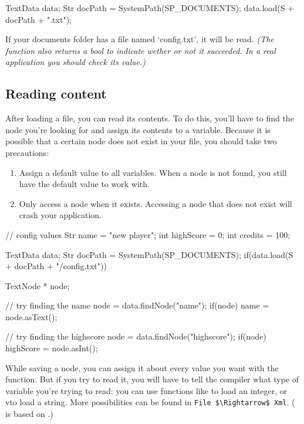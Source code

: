 \begin{code}
TextData data;
Str docPath = SystemPath(SP_DOCUMENTS);
data.load(S + docPath + "\config.txt");
\end{code}

If your documents folder has a file named `config.txt', it will be read. \textsl{(The function also returns a bool to indicate wether or not it succeeded. In a real application you should check its value.)}

\subsection{Reading content}
After loading a file, you can read its contents. To do this, you'll have to find the node you're looking for and assign its contents to a variable. Because it is possible that a certain node does not exist in your file, you should take two precautions:

\begin{enumerate}
	\item Assign a default value to all variables. When a node is not found, you still have the default value to work with.
	\item Only access a node when it exists. Accessing a node that does not exist will crash your application.
\end{enumerate}

\begin{code}
// config values
Str name = "new player";
int highScore = 0;
int credits = 100;

TextData data;
Str docPath = SystemPath(SP_DOCUMENTS);
if(data.load(S + docPath + "/config.txt")) {
   TextNode * node;
	 
	 // try finding the name
	 node = data.findNode("name");
	 if(node) {
	    name = node.asText();
	 }
	 
	 // try finding the highscore
	 node = data.findNode("highscore");
	 if(node) {
	    highScore = node.asInt();
	 }
}
\end{code}

\begin{note}
While saving a node, you can assign it about every value you want with the function. But if you try to read it, you will have to tell the compiler what type of variable you're trying to read: you can use functions like  to load an integer, or  vto load a string. More possibilities can be found in \verb|File $\Rightarrow$ Xml|. ( is based on .)
\end{note}

